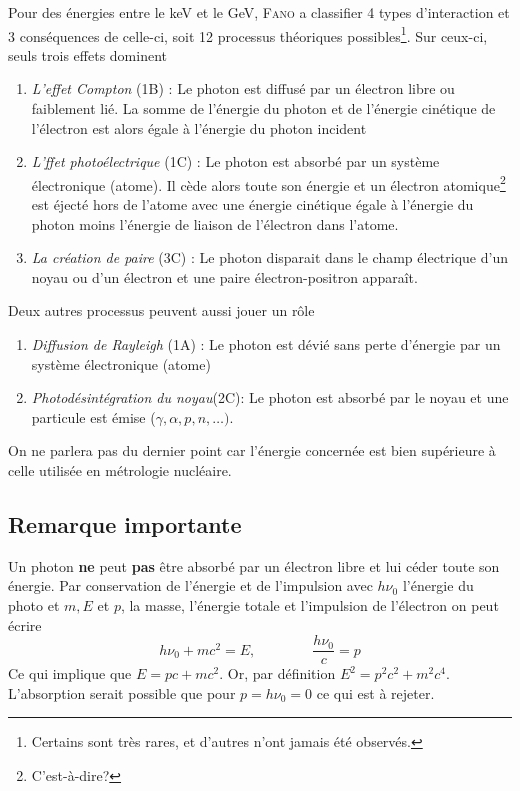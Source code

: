 Pour des énergies entre le keV et le GeV, \textsc{Fano} a classifier 4 types d'interaction et 
3 conséquences de celle-ci, soit 12 processus théoriques possibles\footnote{Certains sont très 
rares, et d'autres n'ont jamais été observés.}. Sur ceux-ci, seuls trois effets dominent
\begin{enumerate}
\item \textit{L'effet Compton} (1B) : Le photon est diffusé par un électron libre ou faiblement lié.
La somme de l'énergie du photon et de l'énergie cinétique de l'électron est alors égale à l'énergie 
du photon incident
\item \textit{L'ffet photoélectrique} (1C) : Le photon est absorbé par un système électronique (atome). 
Il cède alors toute son énergie et un électron atomique\footnote{C'est-à-dire?} est éjecté hors de
l'atome avec une énergie cinétique égale à l'énergie du photon moins l'énergie de liaison de l'électron dans l'atome.

\item \textit{La création de paire} (3C) : Le photon disparait dans le champ électrique d'un noyau 
ou d'un électron et une paire électron-positron apparaît.
\end{enumerate}

Deux autres processus peuvent aussi jouer un rôle
\begin{enumerate}
\item \textit{Diffusion de Rayleigh} (1A) : Le photon est dévié sans perte d'énergie par un système
électronique (atome)
\item \textit{Photodésintégration du noyau}(2C): Le photon est absorbé par le noyau et une particule est émise ($\gamma, \alpha, p, n,\dots)$.
\end{enumerate}
On ne parlera pas du dernier point car l'énergie concernée est bien supérieure à celle utilisée en
métrologie nucléaire.


\subsection{Remarque importante}
Un photon \textbf{ne} peut \textbf{pas} être absorbé par un électron libre et lui céder toute son 
énergie. Par conservation de l'énergie et de l'impulsion avec $h\nu_0$ l'énergie du photo et $m,E$ et 
$p$, la masse, l'énergie totale et l'impulsion de l'électron on peut écrire
\begin{equation}
h\nu_0+mc^2=E,\qquad\qquad \dfrac{h\nu_0}{c}=p
\end{equation}
Ce qui implique que $E=pc+mc^2$. Or, par définition $E^2=p^2c^2+m^2c^4$. L'absorption serait possible
que pour $p=h\nu_0=0$ ce qui est à rejeter. 



